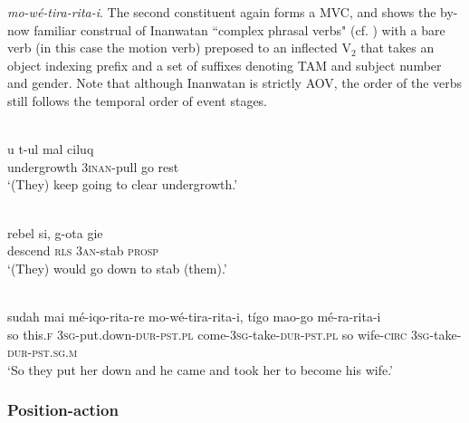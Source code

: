 \textit{mo-wé-tira-rita-i}. The second constituent again forms a MVC, and shows the by-now familiar construal of Inanwatan ``complex phrasal verbs" (cf. \citealt[57]{devries2004}) with a bare verb (in this case the motion verb) preposed to an inflected V$_2$ that takes an object indexing prefix and a set of suffixes denoting TAM and subject number and gender. Note that although Inanwatan is strictly AOV, the order of the verbs still follows the temporal order of event stages.

\ea \label{Bunaq_60}
\\
\gll u t-ul mal ciluq \\
undergrowth 3\textsc{inan}-pull go rest \\
\glft ‘(They) keep going to clear undergrowth.’\\
\z

\ea \label{Bunaq_n1}
\\
\gll rebel si, g-ota gie \\
descend \textsc{rls} 3\textsc{an}-stab \textsc{prosp} \\
\glft ‘(They) would go down to stab (them).’\\ 
\z

\ea \label{Inan_20}
\\
\gll sudah mai mé-iqo-rita-re mo-wé-tira-rita-i, tígo mao-go mé-ra-rita-i \\
so this.\textsc{f} 3\textsc{sg}-put.down-\textsc{dur}-\textsc{pst}.\textsc{pl} come-3\textsc{sg}-take-\textsc{dur}-\textsc{pst}.\textsc{pl} so wife-\textsc{circ} 3\textsc{sg}-take-\textsc{dur}-\textsc{pst}.\textsc{sg}.\textsc{m} \\
\glft `So they put her down and he came and took her to become his wife.'\\ 
\z

\subsubsection{Position-action}\label{sec:position-action}

